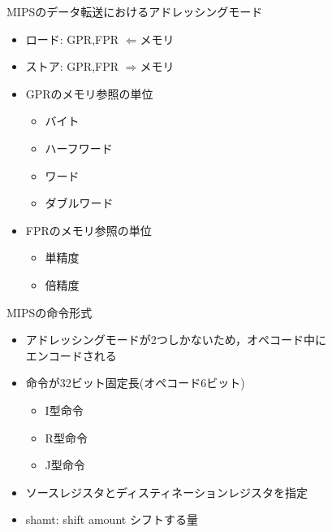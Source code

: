 \documentclass[dvipdfmx]{beamer}
\begin{document}
	\begin{frame}{MIPSのデータ転送におけるアドレッシングモード}
		\begin{itemize}
			\item ロード: GPR,FPR $\Leftarrow$メモリ
			\item ストア: GPR,FPR $\Rightarrow$メモリ
			\item GPRのメモリ参照の単位
				\begin{itemize}
					\item バイト
					\item ハーフワード
					\item ワード
					\item ダブルワード
				\end{itemize}
			\item FPRのメモリ参照の単位
				\begin{itemize}
					\item 単精度
					\item 倍精度
				\end{itemize}
		\end{itemize}
	\end{frame}

	\begin{frame}{MIPSの命令形式}
		\begin{itemize}
			\item アドレッシングモードが2つしかないため，オペコード中に\\エンコードされる
			\item 命令が32ビット固定長(オペコード6ビット)
				\begin{itemize}
					\item I型命令
					\item R型命令
					\item J型命令
				\end{itemize}
			\item ソースレジスタとディスティネーションレジスタを指定
			\item shamt: shift amount シフトする量
		\end{itemize}
	\end{frame}
\end{document}
